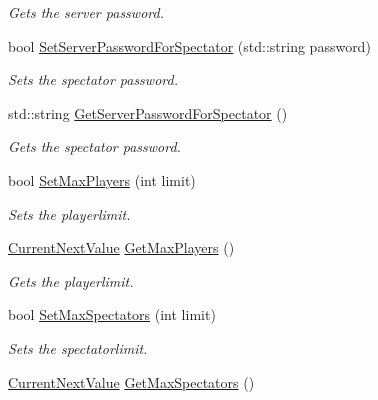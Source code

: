 \begin{DoxyCompactItemize}
\begin{DoxyCompactList}\small\item\em Gets the server password. \end{DoxyCompactList}\item 
bool \hyperlink{classMethods_a7db5e1f09b0cc5e8277ee0d3ec357079}{Set\-Server\-Password\-For\-Spectator} (std\-::string password)
\begin{DoxyCompactList}\small\item\em Sets the spectator password. \end{DoxyCompactList}\item 
\hypertarget{classMethods_a2b23248dc7bf7ddbc451f826d44451b8}{std\-::string \hyperlink{classMethods_a2b23248dc7bf7ddbc451f826d44451b8}{Get\-Server\-Password\-For\-Spectator} ()}\label{classMethods_a2b23248dc7bf7ddbc451f826d44451b8}

\begin{DoxyCompactList}\small\item\em Gets the spectator password. \end{DoxyCompactList}\item 
bool \hyperlink{classMethods_a3bb5185161cf4d1076743e3f187a5c12}{Set\-Max\-Players} (int limit)
\begin{DoxyCompactList}\small\item\em Sets the playerlimit. \end{DoxyCompactList}\item 
\hypertarget{classMethods_ab9406a1962b9c0c64046ee672010fd91}{\hyperlink{structCurrentNextValue}{Current\-Next\-Value} \hyperlink{classMethods_ab9406a1962b9c0c64046ee672010fd91}{Get\-Max\-Players} ()}\label{classMethods_ab9406a1962b9c0c64046ee672010fd91}

\begin{DoxyCompactList}\small\item\em Gets the playerlimit. \end{DoxyCompactList}\item 
bool \hyperlink{classMethods_a6d62a9089c8224eab05d89e040e2b646}{Set\-Max\-Spectators} (int limit)
\begin{DoxyCompactList}\small\item\em Sets the spectatorlimit. \end{DoxyCompactList}\item 
\hypertarget{classMethods_acd5073d1575cc885e2de00faabaca50e}{\hyperlink{structCurrentNextValue}{Current\-Next\-Value} \hyperlink{classMethods_acd5073d1575cc885e2de00faabaca50e}{Get\-Max\-Spectators} ()}\label{classMethods_acd5073d1575cc885e2de00faabaca50e}


\end{DoxyCompactItemize}
